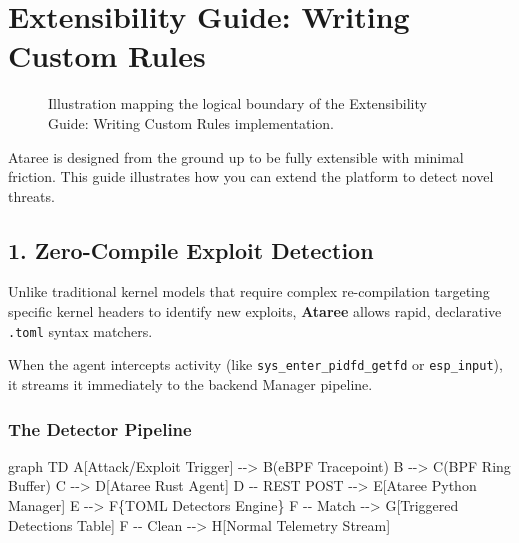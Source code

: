 \documentclass[
  12pt,
]{report}
\newenvironment{Shaded}{}{}
\newcommand{\NormalTok}[1]{#1}
\begin{document}
\chapter{Extensibility Guide: Writing Custom
Rules}\label{extensibility-guide-writing-custom-rules}

\begin{figure}[h]
\centering
\vspace{5cm}
\caption{Illustration mapping the logical boundary of the Extensibility Guide: Writing Custom Rules implementation.}
\end{figure}

Ataree is designed from the ground up to be fully extensible with
minimal friction. This guide illustrates how you can extend the platform
to detect novel threats.

\section{1. Zero-Compile Exploit
Detection}\label{zero-compile-exploit-detection}

Unlike traditional kernel models that require complex re-compilation
targeting specific kernel headers to identify new exploits,
\textbf{Ataree} allows rapid, declarative \texttt{.toml} syntax
matchers.

When the agent intercepts activity (like
\texttt{sys\_enter\_pidfd\_getfd} or \texttt{esp\_input}), it streams it
immediately to the backend Manager pipeline.

\subsection{The Detector Pipeline}\label{the-detector-pipeline}

\begin{Shaded}
\begin{Highlighting}[]
\NormalTok{graph TD}
\NormalTok{    A[Attack/Exploit Trigger] {-}{-}\textgreater{} B(eBPF Tracepoint)}
\NormalTok{    B {-}{-}\textgreater{} C(BPF Ring Buffer)}
\NormalTok{    C {-}{-}\textgreater{} D[Ataree Rust Agent]}
\NormalTok{    D {-}{-} REST POST {-}{-}\textgreater{} E[Ataree Python Manager]}
\NormalTok{    E {-}{-}\textgreater{} F\{TOML Detectors Engine\}}
\NormalTok{    F {-}{-} Match {-}{-}\textgreater{} G[Triggered Detections Table]}
\NormalTok{    F {-}{-} Clean {-}{-}\textgreater{} H[Normal Telemetry Stream]}
\end{Highlighting}
\end{Shaded}
\end{document}
